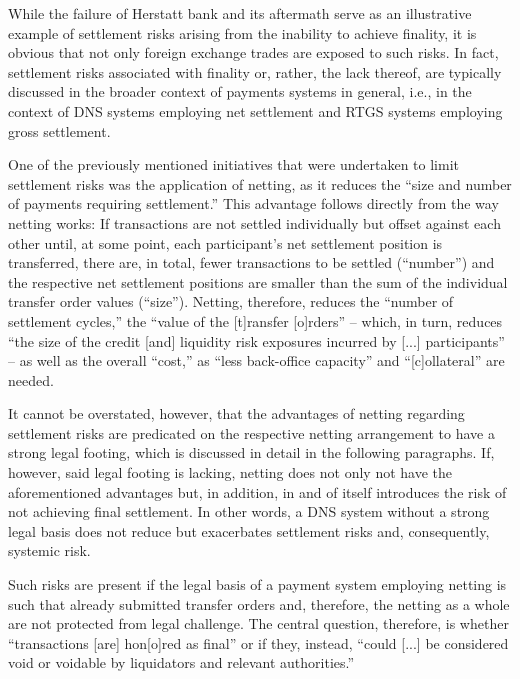 While the failure of Herstatt bank and its aftermath serve as an illustrative example of settlement risks arising from the inability to achieve finality, it is obvious that not only foreign exchange trades are exposed to such risks.
In fact, settlement risks associated with finality or, rather, the lack thereof, are typically discussed in the broader context of payments systems in general, i.e., in the context of DNS systems employing net settlement and RTGS systems employing gross settlement.

One of the previously mentioned initiatives that were undertaken to limit settlement risks was the application of netting, as it reduces the ``size and number of payments requiring settlement.'' \autocite[59]{galati2002}
This advantage follows directly from the way netting works:
If transactions are not settled individually but offset against each other until, at some point, each participant's net settlement position is transferred, there are, in total, fewer transactions to be settled (``number'') and the respective net settlement positions are smaller than the sum of the individual transfer order values (``size'').
Netting, therefore, reduces the ``number of settlement cycles,'' the ``value of the [t]ransfer [o]rders'' -- which, in turn, reduces ``the size of the credit [and] liquidity risk exposures incurred by [...] participants'' -- as well as the overall ``cost,'' as ``less back-office capacity'' and ``[c]ollateral'' are needed. \autocite[40]{vereecken2003}

It cannot be overstated, however, that the advantages of netting regarding settlement risks are predicated on the respective netting arrangement to have a strong legal footing, which is discussed in detail in the following paragraphs.
If, however, said legal footing is lacking, netting does not only not have the aforementioned advantages but, in addition, in and of itself introduces the risk of not achieving final settlement.
In other words, a DNS system without a strong legal basis does not reduce but exacerbates settlement risks and, consequently, systemic risk.

Such risks are present if the legal basis of a payment system employing netting is such that already submitted transfer orders and, therefore, the netting as a whole are not protected from legal challenge.
The central question, therefore, is whether ``transactions [are] hon[o]red as final'' or if they, instead, ``could [...] be considered void or voidable by liquidators and relevant authorities.'' \autocite[16]{bis2016cpmiglossary}

